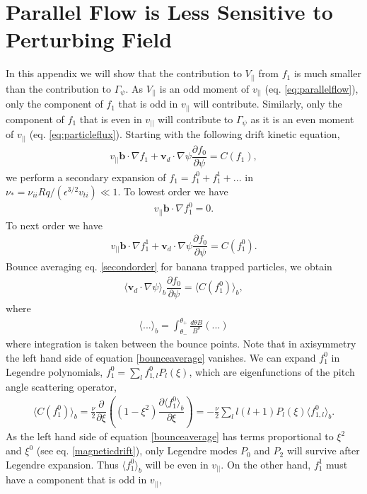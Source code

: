 \documentclass{article}
\numberwithin{figure}{section}
\numberwithin{equation}{section}
\newcommand{\partder}[2]{\dfrac{\partial  #1}{\partial  #2}} %
\begin{document}
\section{Parallel Flow is Less Sensitive to Perturbing Field} \label{parallelflow}
In this appendix we will show that the contribution to $V_{||}$ from $f_1$ is much smaller than the contribution to $\Gamma_{\psi}$. As $V_{||}$ is an odd moment of $v_{||}$ (eq. \ref{eq:parallelflow}), only the component of $f_1$ that is odd in $v_{||}$ will contribute. Similarly, only the component of $f_1$ that is even in $v_{||}$ will contribute to $\Gamma_{\psi}$ as it is an even moment of $v_{||}$ (eq. \ref{eq:particleflux}). Starting with the following drift kinetic equation,
\begin{gather}
v_{||} \bm{b} \cdot \nabla f_1 + \bm{v}_d \cdot \nabla \psi \partder{f_0}{\psi} = C(f_1),
\end{gather}
we perform a secondary expansion of $f_1 = f_1^0 + f_1^1 + ...$ in $\nu_* = \nu_{ii} Rq/(\epsilon^{3/2} v_{ti}) \ll 1$. To lowest order we have
\begin{gather}
v_{||} \bm{b} \cdot \nabla f_1^0 = 0.
\label{firstorder}
\end{gather}
To next order we have
\begin{gather}
v_{||} \bm{b} \cdot \nabla f_1^1 + \bm{v}_d \cdot \nabla \psi \partder{f_0}{\psi} = C(f_1^0).
\label{secondorder}
\end{gather}
Bounce averaging eq. \ref{secondorder} for banana trapped particles, we obtain
\begin{gather}
\langle \bm{v}_d \cdot \nabla \psi \rangle_b \partder{f_0}{\psi} = \langle C(f_1^0) \rangle_b,
\label{bounceaverage}
\end{gather}
where 
\begin{gather}
\langle ... \rangle_b = \int_{\theta_-}^{\theta_+} \frac{d \theta B}{B^{\theta}} (...)
\end{gather}
where integration is taken between the bounce points. Note that in axisymmetry the left hand side of equation \ref{bounceaverage} vanishes. We can expand $f_1^0$ in Legendre polynomials, $f_1^0 = \sum_l f_{1,l}^0 P_l(\xi)$, which are eigenfunctions of the pitch angle scattering operator, 
\begin{gather}
\langle C(f_1^0) \rangle_b = \frac{\nu}{2} \partder{}{\xi} \left( \left(1 - \xi^2\right) \partder{\langle f^0_1\rangle_b}{\xi}  \right) = -\frac{\nu}{2} \sum_l l(l+1)  P_l(\xi) \langle f_{1,l}^0 \rangle_b.
\end{gather}
As the left hand side of equation \ref{bounceaverage} has terms proportional to $\xi^2$ and $\xi^0$ (see eq. \ref{magneticdrift}), only Legendre modes $P_0$ and $P_2$ will survive after Legendre expansion. Thus $\langle f_1^0 \rangle_b$ will be even in $v_{||}$. On the other hand, $f_{1}^1$ must have a component that is odd in $v_{||}$,
\end{document}

